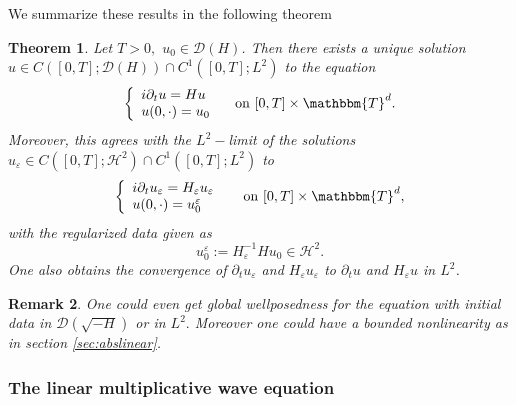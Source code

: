 \documentclass[11pt, oneside]{article}   	%
\newcommand{\assign}{:=}
\newcommand{\cdummy}{\cdot}
\newcommand{\nobracket}{}
\newcommand{\tmop}[1]{\ensuremath{\operatorname{#1}}}
\newtheorem{theorem}{Theorem}[section]
\newtheorem{remark}[theorem]{Remark}
\newcommand{\ssp}{\mathscr{H}}
\begin{document}
We summarize these results in the following theorem

\begin{theorem}
	Let $T > 0,$ $u_0 \in \mathscr{D} (H)$. Then there exists a unique solution
	$u \in \nobracket C ([0, T] ; \mathscr{D}(H)) \cap C^1 ([0,
	T] ; L^2) $ to the equation
	\[ \left\{ \begin{array}{l}
	i \partial_t u = H u \quad\\
	u (0, \cdummy) = u_0
	\end{array} \right. \ \tmop{on} \ [0, T] \times \mathbbm{T}^d . \]
	Moreover, this agrees with the $L^2 -$limit of the solutions
	$u_{\varepsilon} \in C ([0, T] ; \ssp^2) \cap C^1 ([0, T] ; L^2) $ to
	\[ \left\{ \begin{array}{l}
	i \partial_t u_{\varepsilon} = H_{\varepsilon} u_{\varepsilon} \quad\\
	u (0, \cdummy) = u^{\varepsilon}_0
	\end{array} \right. \ \tmop{on} \ [0, T] \times \mathbbm{T}^d, \]
	with the regularized data given as
	\[ u^{\varepsilon}_0 \assign  H_{\varepsilon}^{- 1}  H u_0 \in
	\ssp^2 . \]
	One also obtains the convergence of $\partial_t u_\varepsilon$ and $H_\varepsilon u_\varepsilon$ to $\partial_t u$ and $H_\varepsilon u$ in $L^2$.
\end{theorem}
\begin{remark}\upshape\upshape
	One could even get global wellposedness for the equation with initial data in $\mathscr{D}(\sqrt{-H})$ or in $L^2.$ Moreover one could have a bounded nonlinearity as in section \ref{sec:abslinear}.
\end{remark}
\subsubsection{The linear multiplicative wave equation}
\end{document}
